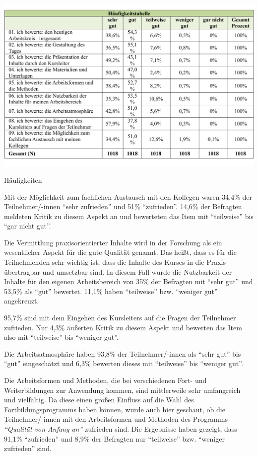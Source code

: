 \documentclass[12pt,a4paper]{article}
\begin{document}
\begin{table}[!ht]
\includegraphics[scale=0.7]{tab06.pdf}
\caption{Häufigkeiten}
\label{}
\end{table}

Mit der Möglichkeit zum fachlichen Austausch mit den Kollegen waren 34,4\% der Teilnehmer/-innen "`sehr zufrieden"' und 51\% "`zufrieden"'. 14,6\% der Befragten meldeten Kritik zu diesem Aspekt an und bewerteten das Item mit "`teilweise"' bis "`gar nicht gut"'.

Die Vermittlung praxisorientierter Inhalte wird in der Forschung als ein wesentlicher Aspekt für die gute Qualität genannt. Das heißt, dass es für die Teilnehmenden sehr wichtig ist, dass die Inhalte des Kurses in die Praxis übertragbar und umsetzbar sind. In diesem Fall wurde die Nutzbarkeit der Inhalte für den eigenen Arbeitsbereich von 35\% der Befragten mit "`sehr gut"' und 53,5\% als "`gut"' bewertet. 11,1\% haben "`teilweise"' bzw. "`weniger gut"' angekreuzt. 

95,7\% sind mit dem Eingehen des Kursleiters auf die Fragen der Teilnehmer zufrieden. Nur 4,3\% äußerten Kritik zu diesem Aspekt und bewerten das Item also mit "`teilweise"' bis "`weniger gut"'. 

Die Arbeitsatmosphäre haben 93,8\% der Teilnehmer/-innen als "`sehr gut"' bis "`gut"' eingeschätzt und 6,3\% bewerten dieses mit "`teilweise"' bis "`weniger gut"'. 

Die Arbeitsformen und Methoden, die bei verschiedenen Fort- und Weiterbildungen zur Anwendung kommen, sind mittlerweile sehr umfangreich und vielfältig. Da diese einen großen Einfluss auf die Wahl des Fortbildungsprogramms haben können, wurde auch hier geschaut, ob die Teilnehmer/-innen mit den Arbeitsformen und Methoden des Programms \textit{"`Qualität von Anfang an"'} zufrieden sind. Die Ergebnisse haben gezeigt, dass 91,1\% "`zufrieden"' und 8,9\% der Befragten nur "`teilweise"' bzw. "`weniger zufrieden"' sind. 
\end{document}
